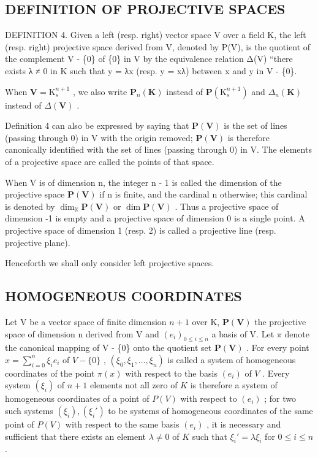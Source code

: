 \subsection{DEFINITION OF PROJECTIVE SPACES}

DEFINITION 4. Given a left (resp. right) vector space V over a field K, the left (resp. right) projective space derived from V, denoted by P(V), is the quotient of the complement V - \{0\} of \{0\} in V by the equivalence relation Δ(V) ``there exists λ ≠ 0 in K such that y = λx (resp. y = xλ) between x and y in V - \{0\}.

When \(\mathbf{V} = \mathrm{K}_s^{n + 1}\) , we also write \(\mathbf{P}_n(\mathbf{K})\) instead of \(\mathbf{P}(\mathrm{K}_s^{n + 1})\) and \(\Delta_n(\mathbf{K})\) instead of \(\Delta (\mathbf{V})\) .

Definition 4 can also be expressed by saying that \(\mathbf{P}(\mathbf{V})\) is the set of lines (passing through 0) in V with the origin removed; \(\mathbf{P}(\mathbf{V})\) is therefore canonically identified with the set of lines (passing through 0) in V. The elements of a projective space are called the points of that space.

When V is of dimension n, the integer n - 1 is called the dimension of the projective space \(\mathbf{P}(\mathbf{V})\) if n is finite, and the cardinal n otherwise; this cardinal is denoted by \(\dim_{\mathbb{K}} \mathbf{P}(\mathbf{V})\) or \(\dim \mathbf{P}(\mathbf{V})\) . Thus a projective space of dimension -1 is empty and a projective space of dimension 0 is a single point. A projective space of dimension 1 (resp. 2) is called a projective line (resp. projective plane).

Henceforth we shall only consider left projective spaces.

\subsection{HOMOGENEOUS COORDINATES}

Let V be a vector space of finite dimension \(n + 1\) over K, \(\mathbf{P}(\mathbf{V})\) the projective space of dimension n derived from V and \((e_{i})_{0 \leqslant i \leqslant n}\) a basis of V. Let \(\pi\) denote the canonical mapping of V - \{0\} onto the quotient set \(\mathbf{P}(\mathbf{V})\) . For every point \(x = \sum_{i=0}^{n} \xi_i e_i\) of \(V - \{0\}\) , \((\xi_0, \xi_1, \ldots, \xi_n)\) is called a system of homogeneous coordinates of the point \(\pi(x)\) with respect to the basis \((e_i)\) of \(V\) . Every system \((\xi_i)\) of \(n + 1\) elements not all zero of \(K\) is therefore a system of homogeneous coordinates of a point of \(P(V)\) with respect to \((e_i)\) ; for two such systems \((\xi_i), (\xi_i')\) to be systems of homogeneous coordinates of the same point of \(P(V)\) with respect to the same basis \((e_i)\) , it is necessary and sufficient that there exists an element \(\lambda \neq 0\) of \(K\) such that \(\xi_i' = \lambda \xi_i\) for \(0 \leqslant i \leqslant n\) .

